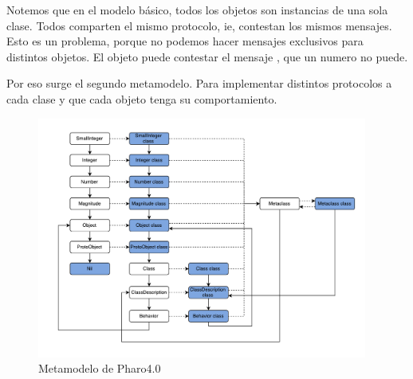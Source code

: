 Notemos que en el modelo b\'asico, todos los objetos son instancias de una sola clase. Todos comparten el mismo protocolo, ie, contestan los mismos mensajes. Esto es un problema, porque no podemos hacer mensajes exclusivos para distintos objetos. El objeto  puede contestar el mensaje , que un numero no puede. 

Por eso surge el segundo metamodelo. Para implementar distintos protocolos a cada clase y que cada objeto tenga su comportamiento. 

\begin{figure}[H]
  \begin{center}
  \includegraphics[height=300px]{images/metamodelo_smalltalk.pdf}
  \end{center}
  \caption{Metamodelo de Pharo4.0}
  \label{fig:metamodelo_pharo}
\end{figure}

